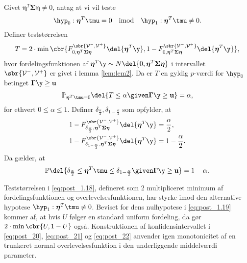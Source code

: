 \begin{lem} \label{lem:lem4}
Givet \(\boldsymbol{\eta}^T \boldsymbol{\Sigma} \boldsymbol{\eta} \neq 0\), antag at vi vil teste
\begin{align*}
\hyp_0: \boldsymbol{\eta}^T \tmu=0 \quad \text{imod} \quad \hyp_1: \boldsymbol{\eta}^T \tmu \neq 0.
\end{align*}
Definer teststørrelsen
\begin{align}
T=2 \cdot \min\cbr{F_{0, \boldsymbol{\eta}^T \boldsymbol{\Sigma} \boldsymbol{\eta}}^{\sbr{\mathcal{V}^-, \mathcal{V}^+}} \del{\boldsymbol{\eta}^T \y}, 1 - F_{0, \boldsymbol{\eta}^T \boldsymbol{\Sigma} \boldsymbol{\eta}}^{\sbr{\mathcal{V}^-, \mathcal{V}^+}} \del{\boldsymbol{\eta}^T \y}}, \label{eq:post_1.18}
\end{align}
hvor fordelingsfunktionen af \(\boldsymbol{\eta}^T \y \sim N \del{0,  \boldsymbol{\eta}^T \boldsymbol{\Sigma} \boldsymbol{\eta}}\) i intervallet \(\sbr{\mathcal{V}^-, \mathcal{V}^+}\) er givet i lemma \ref{lem:lem2}.
Da er \(T\) en gyldig \(p\)-værdi for \(\hyp_0\) betinget \(\boldsymbol{\Gamma} \y \geq \mathbf{u}\)
\begin{align}
\mathbb{P}_{\boldsymbol{\eta}^T \tmu=0} \del{T \leq \alpha \given \boldsymbol{\Gamma} \y \geq \mathbf{u}} = \alpha, \label{eq:post_1.19}
\end{align}
for ethvert \(0 \leq \alpha \leq 1\). 
Definer \(\delta_{\frac{\alpha}{2}}, \delta_{1-\frac{\alpha}{2}}\) som opfylder, at
\begin{align}
1-F_{\delta_{\frac{\alpha}{2}}, \boldsymbol{\eta}^T \boldsymbol{\Sigma} \boldsymbol{\eta}}^{\sbr{\mathcal{V}^-, \mathcal{V}^+}} \del{\boldsymbol{\eta}^T \y} &= \frac{\alpha}{2}, \label{eq:post_20} \\
1-F_{\delta_{1-\frac{\alpha}{2}}, \boldsymbol{\eta}^T \boldsymbol{\Sigma} \boldsymbol{\eta} }^{\sbr{\mathcal{V}^-, \mathcal{V}^+}} \del{\boldsymbol{\eta}^T \y} &= 1-\frac{\alpha}{2}. \label{eq:post_21}
\end{align}
Da gælder, at
\begin{align}
\mathbb{P} \del{\delta_{\frac{\alpha}{2}} \leq  \boldsymbol{\eta}^T \tmu \leq \delta_{1-\frac{\alpha}{2}} \given \boldsymbol{\Gamma} \y \geq \mathbf{u}} = 1- \alpha. \label{eq:post_22}
\end{align}
\end{lem}
%
Teststørrelsen i \eqref{eq:post_1.18}, defineret som 2 multipliceret minimum af fordelingsfunktionen  og overlevelsesfunktionen, har styrke imod den alternative hypotese \(\hyp_1: \boldsymbol{\eta}^T \tmu \neq 0\).
Beviset for dens nulhypotese i \eqref{eq:post_1.19} kommer af, at hvis \(U\) følger en standard uniform fordeling, da gør \(2 \cdot \min \cbr{U,1-U}\) også.
Konstruktionen af konfidensintervallet i \eqref{eq:post_20}, \eqref{eq:post_21} og \eqref{eq:post_22} anvender igen monotonicitet af en trunkeret normal overlevelsesfunktion i den underliggende middelværdi parameter.

